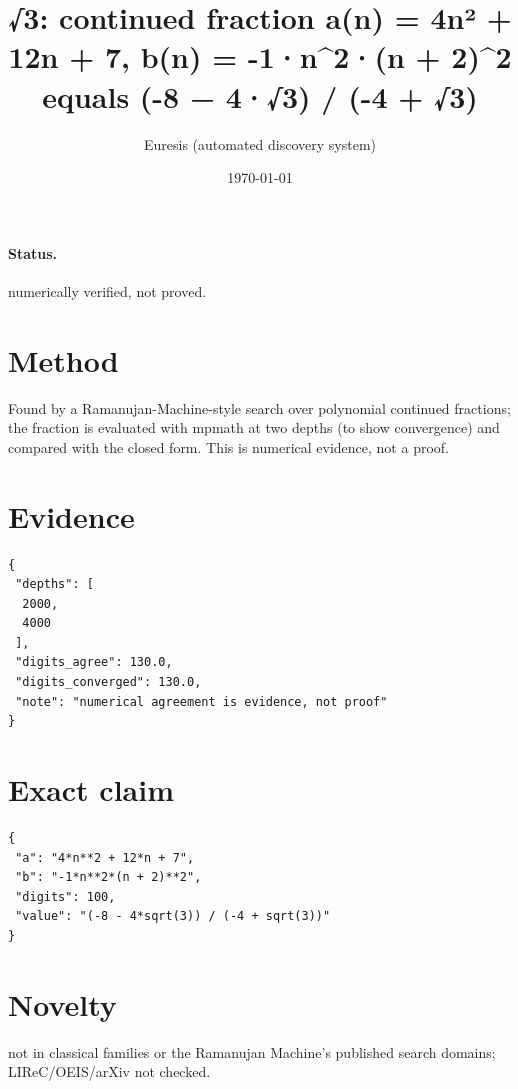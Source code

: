 \documentclass[11pt]{article}
\title{√3: continued fraction a(n) = 4n² + 12n + 7, b(n) = -1·n\^{}2·(n + 2)\^{}2 equals (-8 − 4·√3) / (-4 + √3)}
\author{Euresis (automated discovery system)}
\date{\today}
\begin{document}
\maketitle
\paragraph{Status.} numerically verified, not proved.
\section{Method}
Found by a Ramanujan-Machine-style search over polynomial continued fractions; the fraction is evaluated with mpmath at two depths (to show convergence) and compared with the closed form. This is numerical evidence, not a proof.
\section{Evidence}
\begin{verbatim}
{
 "depths": [
  2000,
  4000
 ],
 "digits_agree": 130.0,
 "digits_converged": 130.0,
 "note": "numerical agreement is evidence, not proof"
}
\end{verbatim}
\section{Exact claim}
\begin{verbatim}
{
 "a": "4*n**2 + 12*n + 7",
 "b": "-1*n**2*(n + 2)**2",
 "digits": 100,
 "value": "(-8 - 4*sqrt(3)) / (-4 + sqrt(3))"
}
\end{verbatim}
\section{Novelty}
not in classical families or the Ramanujan Machine's published search domains; LIReC/OEIS/arXiv not checked.
\end{document}
